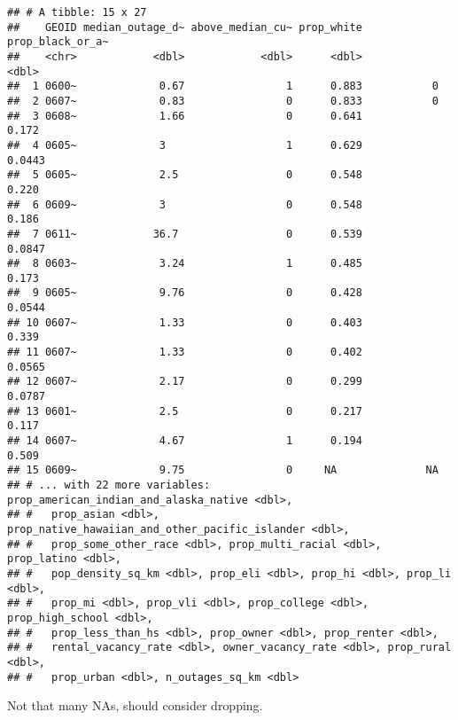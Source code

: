 \documentclass[
]{article}
\newenvironment{Shaded}{\begin{snugshade}}{\end{snugshade}}
\newcommand{\CommentTok}[1]{\textcolor[rgb]{0.56,0.35,0.01}{\textit{#1}}}
\newcommand{\KeywordTok}[1]{\textcolor[rgb]{0.13,0.29,0.53}{\textbf{#1}}}
\newcommand{\NormalTok}[1]{#1}
\newcommand{\OperatorTok}[1]{\textcolor[rgb]{0.81,0.36,0.00}{\textbf{#1}}}
\newcommand{\StringTok}[1]{\textcolor[rgb]{0.31,0.60,0.02}{#1}}
\begin{document}
\begin{verbatim}
## # A tibble: 15 x 27
##    GEOID median_outage_d~ above_median_cu~ prop_white prop_black_or_a~
##    <chr>            <dbl>            <dbl>      <dbl>            <dbl>
##  1 0600~             0.67                1      0.883           0     
##  2 0607~             0.83                0      0.833           0     
##  3 0608~             1.66                0      0.641           0.172 
##  4 0605~             3                   1      0.629           0.0443
##  5 0605~             2.5                 0      0.548           0.220 
##  6 0609~             3                   0      0.548           0.186 
##  7 0611~            36.7                 0      0.539           0.0847
##  8 0603~             3.24                1      0.485           0.173 
##  9 0605~             9.76                0      0.428           0.0544
## 10 0607~             1.33                0      0.403           0.339 
## 11 0607~             1.33                0      0.402           0.0565
## 12 0607~             2.17                0      0.299           0.0787
## 13 0601~             2.5                 0      0.217           0.117 
## 14 0607~             4.67                1      0.194           0.509 
## 15 0609~             9.75                0     NA              NA     
## # ... with 22 more variables: prop_american_indian_and_alaska_native <dbl>,
## #   prop_asian <dbl>, prop_native_hawaiian_and_other_pacific_islander <dbl>,
## #   prop_some_other_race <dbl>, prop_multi_racial <dbl>, prop_latino <dbl>,
## #   pop_density_sq_km <dbl>, prop_eli <dbl>, prop_hi <dbl>, prop_li <dbl>,
## #   prop_mi <dbl>, prop_vli <dbl>, prop_college <dbl>, prop_high_school <dbl>,
## #   prop_less_than_hs <dbl>, prop_owner <dbl>, prop_renter <dbl>,
## #   rental_vacancy_rate <dbl>, owner_vacancy_rate <dbl>, prop_rural <dbl>,
## #   prop_urban <dbl>, n_outages_sq_km <dbl>
\end{verbatim}

Not that many NAs, should consider dropping.

\begin{Shaded}
\end{Shaded}
\end{document}
